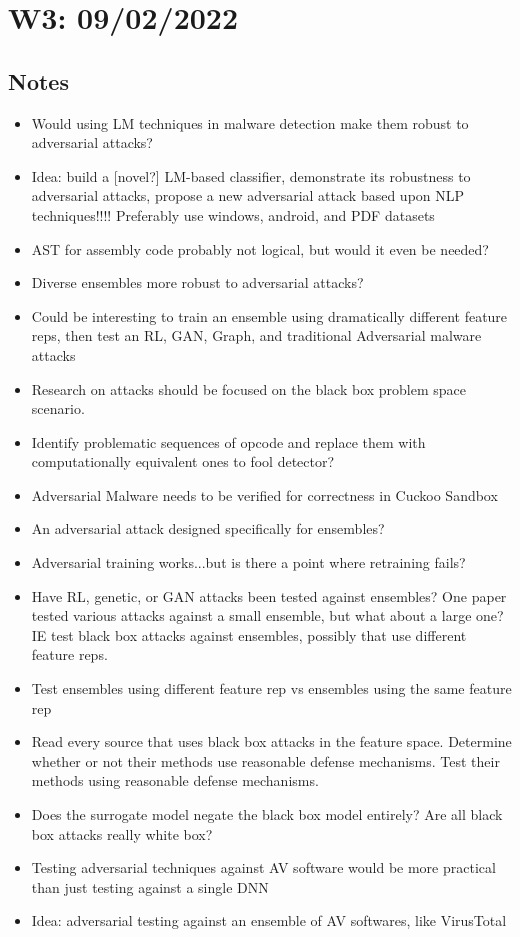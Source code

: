\documentclass{article}
\begin{document}
\section*{W3: 09/02/2022}

\subsection*{Notes}

\begin{itemize}
	\item Would using LM techniques in malware detection make them robust to adversarial attacks?
	\item Idea: build a [novel?] LM-based classifier, demonstrate its robustness to adversarial attacks, propose a new adversarial attack based upon NLP techniques!!!! Preferably use windows, android, and PDF datasets
	\item AST for assembly code probably not logical, but would it even be needed?
	\item Diverse ensembles more robust to adversarial attacks?
	\item Could be interesting to train an ensemble using dramatically different feature reps, then test an RL, GAN, Graph, and traditional Adversarial malware attacks
	\item Research on attacks should be focused on the black box problem space scenario.
	\item Identify problematic sequences of opcode and replace them with computationally equivalent ones to fool detector?
	\item Adversarial Malware needs to be verified for correctness in Cuckoo Sandbox
	\item An adversarial attack designed specifically for ensembles?
	\item Adversarial training works...but is there a point where retraining fails?
	\item Have RL, genetic, or GAN attacks been tested against ensembles? One paper tested various attacks against a small ensemble, but what about a large one? IE test black box attacks against ensembles, possibly that use different feature reps.
	\item Test ensembles using different feature rep vs ensembles using the same feature rep
	\item Read every source that uses black box attacks in the feature space. Determine whether or not their methods use reasonable defense mechanisms. Test their methods using reasonable defense mechanisms.
	\item Does the surrogate model negate the black box model entirely? Are all black box attacks really white box?
	\item Testing adversarial techniques against AV software would be more practical than just testing against a single DNN
	\item Idea: adversarial testing against an ensemble of AV softwares, like VirusTotal
\end{itemize}
\end{document}
